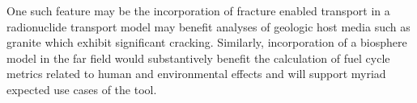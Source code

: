 One such feature may be the incorporation of fracture enabled transport in a 
radionuclide transport model may benefit analyses of geologic host media such as 
granite which exhibit significant cracking. Similarly, incorporation of a 
biosphere model in the far field would substantively benefit the calculation of 
fuel cycle metrics related to human and environmental effects and will support 
myriad expected use cases of the tool.
